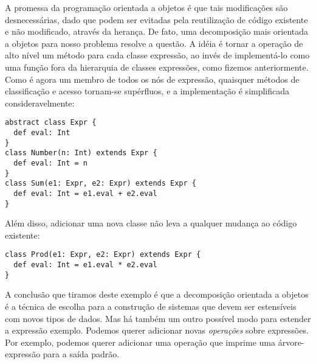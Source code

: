 A promessa da programa\c{c}\~{a}o orientada a objetos \'{e} que tais modifica\c{c}\~{o}es 
s\~{a}o desnecess\'{a}rias, dado que podem ser evitadas pela reutiliza\c{c}\~{a}o de c\'{o}digo 
existente e n\~{a}o modificado, atrav\'{e}s da heran\c{c}a. De fato, uma decomposi\c{c}\~{a}o 
mais orientada a objetos para nosso problema resolve a quest\~{a}o. A id\'{e}ia \'{e} tornar
a opera\c{c}\~{a}o de alto n\'{i}vel  um m\'{e}todo para cada classe express\~{a}o, ao 
inv\'{e}s de implement\'{a}-lo como uma fun\c{c}\~{a}o fora da hierarquia de classes express\~{o}es, como 
fizemos anteriormente. Como  \'{e} agora um membro de todos os n\'{o}s de express\~{a}o, 
quaisquer m\'{e}todos de classifica\c{c}\~{a}o e acesso tornam-se sup\'{e}rfluos, e a implementa\c{c}\~{a}o 
\'{e} simplificada consideravelmente:  
\begin{lstlisting}
abstract class Expr {
  def eval: Int
}
class Number(n: Int) extends Expr {
  def eval: Int = n
}
class Sum(e1: Expr, e2: Expr) extends Expr {
  def eval: Int = e1.eval + e2.eval
}
\end{lstlisting}

Al\'{e}m disso, adicionar uma nova classe  n\~{a}o leva a qualquer mudan\c{c}a ao c\'{o}digo existente:
\begin{lstlisting}
class Prod(e1: Expr, e2: Expr) extends Expr {
  def eval: Int = e1.eval * e2.eval
}
\end{lstlisting}

A conclus\~{a}o que tiramos deste exemplo \'{e} que a decomposi\c{c}\~{a}o orientada a objetos
\'{e} a t\'{e}cnica de escolha para a constru\c{c}\~{a}o de sistemas que devem ser estens\'{i}veis
com novos tipos de dados. Mas h\'{a} tamb\'{e}m um outro poss\'{i}vel modo para estender a 
express\~{a}o exemplo. Podemos querer adicionar novas {\em opera\c{c}\~{o}es} sobre express\~{o}es.
Por exemplo, podemos querer adicionar uma opera\c{c}\~{a}o que imprime uma \'{a}rvore-express\~{a}o
para a sa\'{i}da padr\~{a}o.  

